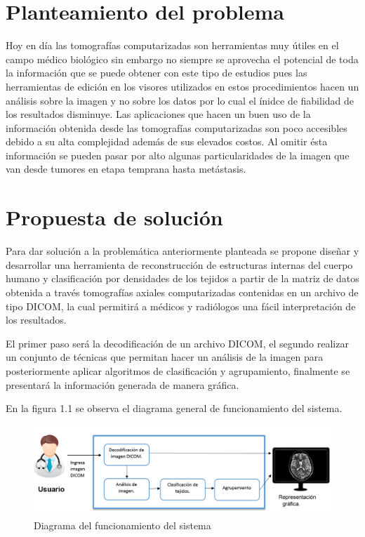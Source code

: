 \documentclass[12pt]{report}
\begin{document}
\section{Planteamiento del problema}
Hoy en día las tomografías computarizadas son herramientas muy útiles en el campo médico biológico sin embargo no siempre se aprovecha el potencial de toda la información que se puede obtener con este tipo de estudios pues las herramientas de edición en los visores utilizados en estos procedimientos hacen un análisis sobre la imagen y no sobre los datos por lo cual el ínidce de fiabilidad de los resultados disminuye. Las aplicaciones que hacen un buen uso de la información obtenida desde las tomografías computarizadas son poco accesibles debido a su alta complejidad además de sus elevados costos. Al omitir ésta información se pueden pasar por alto algunas particularidades de la imagen que van desde tumores en etapa temprana hasta metástasis. \\

\section{Propuesta de solución}
Para dar solución a la problemática anteriormente planteada se propone diseñar y desarrollar una herramienta de reconstrucción de estructuras internas del cuerpo humano y clasificación por densidades de los tejidos a partir de la matriz de datos obtenida a través tomografías axiales computarizadas contenidas en un archivo de tipo DICOM, la cual permitirá a médicos y radiólogos una fácil interpretación de  los resultados.

El primer paso será la decodificación de un archivo DICOM, el segundo realizar un conjunto de técnicas que permitan hacer un análisis de la imagen para posteriormente aplicar algoritmos de clasificación y agrupamiento, finalmente se presentará la información generada de manera gráfica.

En la figura 1.1 se observa el diagrama general de funcionamiento del sistema.
\begin{figure}[H]
\centering
\includegraphics[width = 13 cm, height = 5 cm]{diagramageneral}
\caption{Diagrama del funcionamiento del sistema}
\end{figure}
\end{document}
